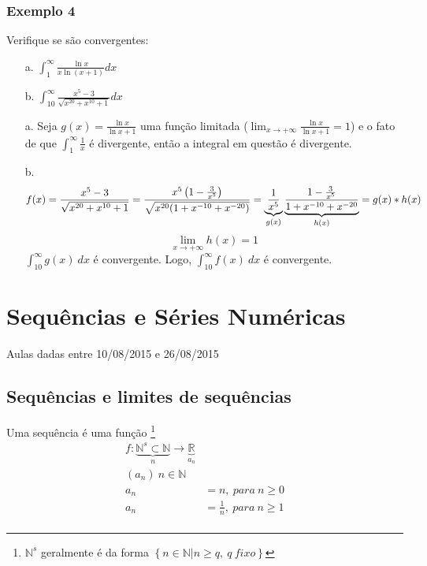 \documentclass[12pt,openany, letterpaper]{book}
\begin{document}
\subsection{Exemplo 4}
\label{sub:ex144}

\hspace{5mm} Verifique se são convergentes:
\begin{enumerate}
\item [a.] $\displaystyle{\int_1^{\infty} \frac{\ln x}{x \ln \left(x+1\right)} dx}$
\item [b.] $\displaystyle{\int_{10}^{\infty}\frac{x^5-3}{\sqrt{x^{20}+x^{10}+1}} dx}$
\end{enumerate}

\begin{enumerate}
\item [a.] Seja  $\displaystyle{g(x) = \frac{\ln x}{\ln {x+1}}}$ uma função limitada ($\displaystyle{\lim_{x \rightarrow +\infty} \frac{\ln x}{\ln {x+1}} = 1}$) e o fato de que $\displaystyle{\int_1^{\infty} \frac{1}{x}}$ é divergente, então a integral em questão é divergente.
\item [b.] $$f(x) = \frac{x^5-3}{\sqrt{x^{20}+x^{10}+1}} = \frac{x^5\left(1-\frac{3}{x^5}\right)}{\sqrt{x^{20}(1+x^{-10}+x^{-20})}}= \underbrace{1 \over x^5}_{g(x)} \underbrace{\frac{1-\frac{3}{x^5}}{1+x^{-10}+x^{-20}}}_{h(x)} = g(x)*h(x)$$ 
$$\lim_{x \rightarrow +\infty} h(x) = 1$$ 
$\displaystyle{\int_{10}^{\infty} g(x)\ dx}$ é convergente. Logo, $\displaystyle{\int_{10}^{\infty} f(x)\ dx}$ é convergente.
\end{enumerate}

\chapter{Sequências e Séries Numéricas} Aulas dadas entre 10/08/2015 e 26/08/2015
\label{chap:c2}

\section{Sequências e limites de sequências}
\label{sec:s21}

\hspace{5mm} Uma sequência  é uma função \footnote{$\mathds{N}^s$ geralmente é da forma $\left\{ n \in \mathds{N} | n \geq q , \ q \ fixo \right\} $ } \begin{align*}
f: \underbrace{\mathds{N}^s \subset \mathds{N}}_n \rightarrow \underbrace{\mathds{R}}_{a_n} \\
(a_n) \ n \in \mathds{N} \\
a_n &= n,\ para \ n \geq 0 \\
a_n &= \frac{1}{n} ,\ para \ n \geq 1 \\
\end{align*}
\end{document}
